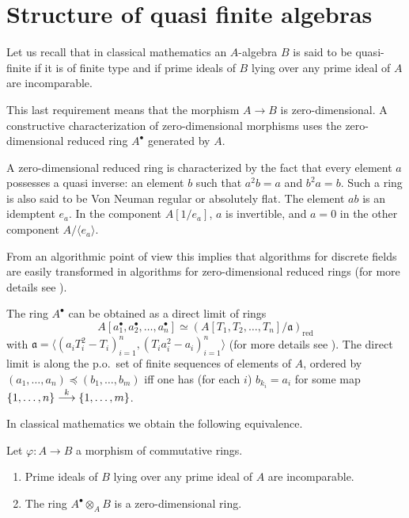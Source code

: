 \documentclass[11pt,a4paper,twoside]{article}
\newcommand{\gothic}{\mathfrak}
\newcommand{\fa}{{\gothic a}}
\newcommand{\bul}{^{\bullet}}
\newcommand\gen[1]{{\langle #1 \rangle}}
\newcommand\vers[1]{\buildrel{#1}\over \longrightarrow }
\begin{document}
 



\section{Structure of quasi finite algebras}
\label{subsecThmain3} 


Let us recall that in classical mathematics
an $A$-algebra $B$ is said to be quasi-finite if it
is of finite type and if prime ideals of $B$ lying over any prime ideal of $A$ are incomparable.

This last requirement means that the morphism $A\to B$ is zero-dimensional.
A constructive characterization of zero-dimensional morphisms uses 
the zero-dimensional reduced ring $A^{\bullet}$ generated by $A$.

A zero-dimensional reduced ring is characterized by the fact that every element $a$ possesses a quasi inverse: an element $b$ such that $a^2b=a$
and $b^2a=b$. Such a ring is also said to be Von Neuman regular or absolutely flat.
The element $ab$ is an idemptent $e_a$. In the component $A[1/e_a]$, $a$ is invertible, and  $a=0$ in the other component $A/\gen{e_a}$.

From an algorithmic point of view this implies that algorithms for discrete 
fields are easily transformed in algorithms for zero-dimensional reduced rings
(for more details see \cite[Chapter 4]{LQPTF}).

The ring $A^{\bullet}$ can be obtained as a direct limit of rings
$$
 A[a_1\bul,a_2\bul,\ldots,a_n\bul]
\simeq
\left( A[T_1,T_2,\ldots,T_n]/{\fa}\right)_{\mathrm{red}}
$$
with $\fa=\gen{(a_iT_i^2-T_i)_{i=1}^n,(T_ia_i^2-a_i)_{i=1}^n}$
(for more details see \cite[section 11.4]{LQPTF}).
The direct limit is along the p.o.\ set of finite sequences of elements of $A$,
ordered by $(a_1,\dots,a_n)\preceq(b_1,\dots,b_m)$ iff one has (for each $i$) $b_{k_i}=a_i$
for some map $\{1,\dots,n\}\vers k \{1,\dots,m\}$. 

\smallskip 
In classical mathematics we obtain the following equivalence.


\begin{proposition} \label{propdefizerodim}
Let  $\varphi:A \to B$ a morphism of commutative rings.
\begin{enumerate}
%
\item Prime ideals of $B$ lying over any prime ideal of $A$ are incomparable.  
%
\item The ring $A\bul\otimes_AB$ is a zero-dimensional ring. 
%
\end{enumerate}
\end{proposition}
\end{document}
